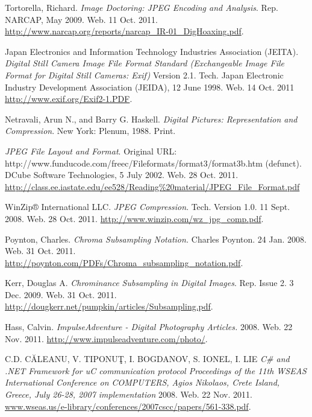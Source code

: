 \documentclass[oneside]{ecsgdp}         %
\begin{document}
\begin{thebibliography}{9}

	 Tortorella, Richard. \emph{Image Doctoring: JPEG Encoding and Analysis}. Rep. NARCAP, May 2009. Web. 11 Oct. 2011. \url{http://www.narcap.org/reports/narcap_IR-01_DigHoaxing.pdf}.
	
	 Japan Electronics and Information Technology Industries Association (JEITA). \emph{Digital Still Camera Image File Format Standard (Exchangeable Image File Format for Digital Still Cameras: Exif)} Version 2.1. Tech. Japan Electronic Industry Development Association (JEIDA), 12 June 1998. Web. 14 Oct. 2011 \url{http://www.exif.org/Exif2-1.PDF}.
	
	 Netravali, Arun N., and Barry G. Haskell. \emph{Digital Pictures: Representation and Compression}. New York: Plenum, 1988. Print. 
	
	 \emph{JPEG File Layout and Format}. Original URL: \\http://www.funducode.com/freec/Fileformats/format3/format3b.htm (defunct).\\DCube Software Technologies, 5 July 2002. Web. 28 Oct. 2011. \url{http://class.ee.iastate.edu/ee528/Reading%20material/JPEG_File_Format.pdf}
	
	 WinZip® International LLC. \emph{JPEG Compression}. Tech. Version 1.0. 11 Sept. 2008. Web. 28 Oct. 2011. \url{http://www.winzip.com/wz_jpg_comp.pdf}.
	
	 Poynton, Charles. \emph{Chroma Subsampling Notation.} Charles Poynton. 24 Jan. 2008. Web. 31 Oct. 2011. \url{http://poynton.com/PDFs/Chroma_subsampling_notation.pdf}.
	
	 Kerr, Douglas A. \emph{Chrominance Subsampling in Digital Images}. Rep. Issue 2. 3 Dec. 2009. Web. 31 Oct. 2011. \url{http://dougkerr.net/pumpkin/articles/Subsampling.pdf}.
	
	 Hass, Calvin. \emph{ImpulseAdventure - Digital Photography Articles.} 2008. Web. 22 Nov. 2011. \url{http://www.impulseadventure.com/photo/}.
	
	 C.D. CĂLEANU, V. TIPONUŢ, I. BOGDANOV, S. IONEL, I. LIE \emph{C\# and .NET Framework for uC communication protocol Proceedings of the 11th WSEAS International Conference on COMPUTERS, Agios Nikolaos, Crete Island, Greece, July 26-28, 2007
implementation} 2008. Web. 22 Nov. 2011.
\url{www.wseas.us/e-library/conferences/2007cscc/papers/561-338.pdf}.


\end{thebibliography}
\end{document}
